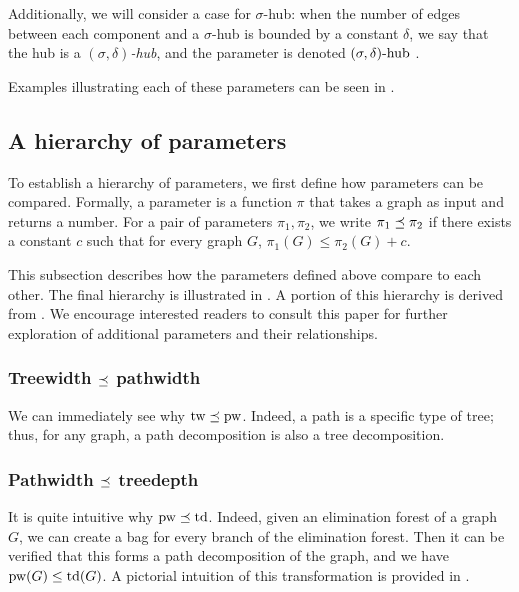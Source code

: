 \medskip

Additionally, we will consider a case for $\sigma$-hub: when the number of edges between each component and a $\sigma$-hub is bounded by a constant $\delta$, we say that the hub is a \textit{$(\sigma, \delta)$-hub}, and the parameter is denoted $(\sigma, \delta)\text{-hub}$ \cite{esmer2024fundamental}.

Examples illustrating each of these parameters can be seen in .



\subsection{A hierarchy of parameters}

To establish a hierarchy of parameters, we first define how parameters can be compared. Formally, a parameter is a function $\pi$ that takes a graph as input and returns a number. For a pair of parameters $\pi_1, \pi_2$, we write $\pi_1 \preceq \pi_2$ if there exists a constant $c$ such that for every graph $G$, $\pi_1(G) \leq \pi_2(G) + c$.

This subsection describes how the parameters defined above compare to each other. The final hierarchy is illustrated in . A portion of this hierarchy is derived from \cite{fellows2013towards}. We encourage interested readers to consult this paper for further exploration of additional parameters and their relationships.



\subsubsection*{Treewidth $\preceq$ pathwidth}

We can immediately see why $\text{tw} \preceq \text{pw}$. Indeed, a path is a specific type of tree; thus, for any graph, a path decomposition is also a tree decomposition.

\subsubsection*{Pathwidth $\preceq$ treedepth}

It is quite intuitive why $\text{pw} \preceq \text{td}$. Indeed, given an elimination forest of a graph $G$, we can create a bag for every branch of the elimination forest. Then it can be verified that this forms a path decomposition of the graph, and we have $\text{pw}(G) \leq \text{td}(G)$. A pictorial intuition of this transformation is provided in .

